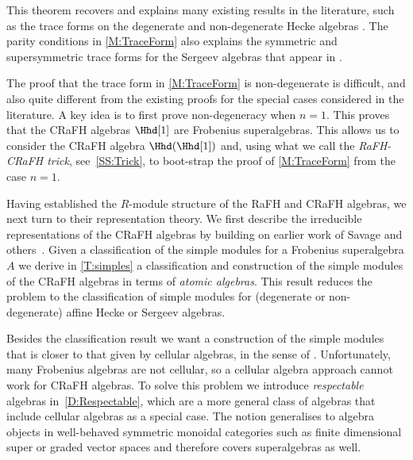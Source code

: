 \documentclass[a4paper,11pt]{amsart}
\numberwithin{equation}{subsection}
\theoremstyle{definition}
\theoremstyle{theorem}
\theoremstyle{remark}
\newcommand\RR{R}
\begin{document}
This theorem recovers and explains many existing results in the
literature, such as the trace forms on the degenerate and non-degenerate
Hecke algebras \cite{MalleMathas,BK:HigherSchurWeyl}. The parity
conditions in \autoref{M:TraceForm} also explains the symmetric and
supersymmetric trace forms for the Sergeev algebras that appear in
\cite{LiShi:SergeevCocenter}.

The proof that the trace form in \autoref{M:TraceForm} is non-degenerate
is difficult, and also quite different from the existing proofs for the
special cases considered in the literature. A key idea is to first
prove non-degeneracy when $n=1$. This proves that the CRaFH
algebras $\Hhd[1]$ are Frobenius superalgebras. This allows us to
consider the CRaFH algebra $\Hhd(\Hhd[1])$ and, using what we call the
\emph{RaFH-CRaFH trick}, see~\autoref{SS:Trick}, to boot-strap the proof of
\autoref{M:TraceForm} from the case $n=1$.

Having established the $\RR$-module structure of the RaFH and CRaFH
algebras, we next turn to their representation theory. We first describe
the irreducible representations of the CRaFH algebras by building on
earlier work of Savage and
others~\cite{RossoSavage:QuantumAffineWreath,Savage:AffineWreath,WanWang}.
Given a classification of the simple modules for a Frobenius superalgebra $A$ we derive in \autoref{T:simples}
a classification and construction of the simple modules of the CRaFH
algebras in terms of \emph{atomic algebras}. This result reduces the problem to the classification of simple modules for  (degenerate or non-degenerate) affine Hecke or Sergeev algebras.

Besides the classification result we
want a construction of the simple modules that is closer to that given
by cellular algebras, in the sense of \cite{GrahamLehrer:Cellular}. Unfortunately, many Frobenius algebras are not cellular, so a cellular
algebra approach cannot work for CRaFH algebras. To solve this problem
we introduce  \emph{respectable} algebras in~\autoref{D:Respectable},
which are a more general class of algebras that include cellular
algebras as a special case. The notion generalises to algebra objects in well-behaved symmetric monoidal categories such as finite dimensional super or graded vector spaces and therefore covers superalgebras as well.
\end{document}
